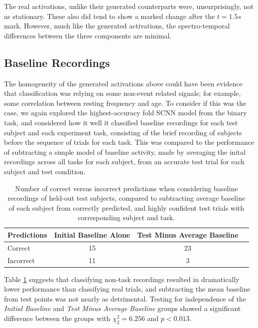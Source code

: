 \documentclass[fleqn,10pt]{wlscirep}
\begin{document}
The real activations, unlike their generated counterparts were, unsurprisingly, not as stationary. These also did tend to show a marked change after the $t=1.5s$ mark. However, much like the generated activations, the spectro-temporal differences between the three components are minimal.

\subsection*{Baseline Recordings}

The homogeneity of the generated activations above could have been evidence that classification was relying on some non-event related signals; for example, some correlation between resting frequency and age. To consider if this was the case, we again explored the highest-accuracy fold SCNN model from the binary task, and considered how it well it classified baseline recordings for each test subject and each experiment task, consisting of the brief recording of subjects before the sequence of trials for each task. This was compared to the performance of subtracting a simple model of baseline activity, made by averaging the inital recordings across all tasks for each subject, from an accurate test trial for each subject and test condition.

\begin{table}[h]
 \caption{Number of correct versus incorrect predictions when considering baseline recordings of held-out test subjects, compared to subtracting average baseline of each subject from correctly predicted, and highly confident test trials with corresponding subject and task.}
 \centering
 \begin{tabular}{l | c | c | c}
   \toprule
   \textbf{Predictions} &  \textbf{Initial Baseline Alone} & \textbf{Test Minus Average Baseline} \\
   \toprule
                        Correct           & 15 & 23  \\
                        Incorrect         & 11 &  3  \\ 
   \bottomrule
 \end{tabular}
 \label{tab:rest_performance3}
\end{table}

Table \ref{tab:rest_performance3} suggests that classifying non-task recordings resulted in dramatically lower performance than classifying real trials, and subtracting the mean baseline from test points was not nearly as detrimental. Testing for independence of the {\em Initial Baseline} and {\em Test Minus Average Baseline} groups showed a significant difference between the groups with $\chi^2_{2}=6.256$ and $p<0.013$.
\end{document}
